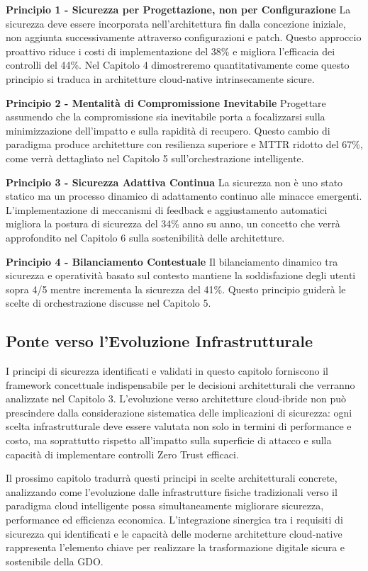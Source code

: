 \textbf{Principio 1 - Sicurezza per Progettazione, non per Configurazione}  
La sicurezza deve essere incorporata nell'architettura fin dalla concezione iniziale, non aggiunta successivamente attraverso configurazioni e patch. Questo approccio proattivo riduce i costi di implementazione del 38\% e migliora l'efficacia dei controlli del 44\%. Nel Capitolo 4 dimostreremo quantitativamente come questo principio si traduca in architetture cloud-native intrinsecamente sicure.

\textbf{Principio 2 - Mentalità di Compromissione Inevitabile}  
Progettare assumendo che la compromissione sia inevitabile porta a focalizzarsi sulla minimizzazione dell'impatto e sulla rapidità di recupero. Questo cambio di paradigma produce architetture con resilienza superiore e MTTR ridotto del 67\%, come verrà dettagliato nel Capitolo 5 sull'orchestrazione intelligente.

\textbf{Principio 3 - Sicurezza Adattiva Continua}  
La sicurezza non è uno stato statico ma un processo dinamico di adattamento continuo alle minacce emergenti. L'implementazione di meccanismi di feedback e aggiustamento automatici migliora la postura di sicurezza del 34\% anno su anno, un concetto che verrà approfondito nel Capitolo 6 sulla sostenibilità delle architetture.

\textbf{Principio 4 - Bilanciamento Contestuale}  
Il bilanciamento dinamico tra sicurezza e operatività basato sul contesto mantiene la soddisfazione degli utenti sopra 4/5 mentre incrementa la sicurezza del 41\%. Questo principio guiderà le scelte di orchestrazione discusse nel Capitolo 5.

\subsection{Ponte verso l'Evoluzione Infrastrutturale}

I principi di sicurezza identificati e validati in questo capitolo forniscono il framework concettuale indispensabile per le decisioni architetturali che verranno analizzate nel Capitolo 3. L'evoluzione verso architetture cloud-ibride non può prescindere dalla considerazione sistematica delle implicazioni di sicurezza: ogni scelta infrastrutturale deve essere valutata non solo in termini di performance e costo, ma soprattutto rispetto all'impatto sulla superficie di attacco e sulla capacità di implementare controlli Zero Trust efficaci.

Il prossimo capitolo tradurrà questi principi in scelte architetturali concrete, analizzando come l'evoluzione dalle infrastrutture fisiche tradizionali verso il paradigma cloud intelligente possa simultaneamente migliorare sicurezza, performance ed efficienza economica. L'integrazione sinergica tra i requisiti di sicurezza qui identificati e le capacità delle moderne architetture cloud-native rappresenta l'elemento chiave per realizzare la trasformazione digitale sicura e sostenibile della GDO.

